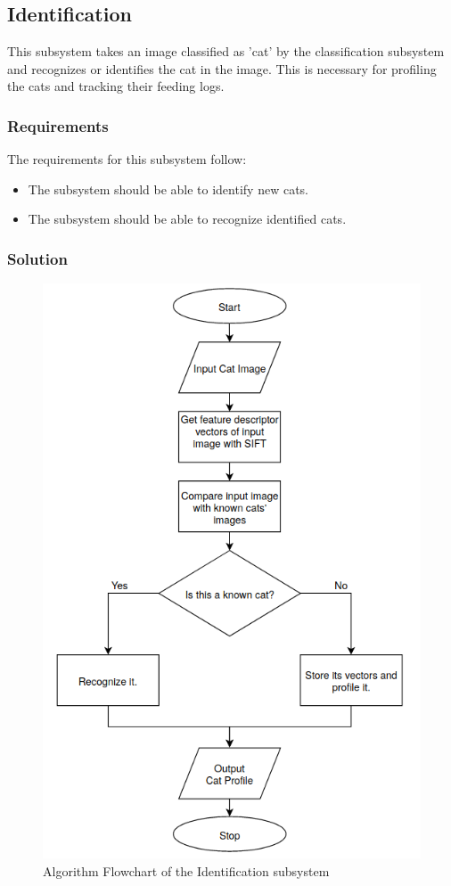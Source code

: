 \subsection{Identification} \label{subsec:identification}

This subsystem takes an image classified as 'cat' by the classification subsystem and recognizes or identifies the cat in the image. This is necessary for profiling the cats and tracking their feeding logs.

\subsubsection{Requirements}

The requirements for this subsystem follow:

\begin{itemize}

\item The subsystem should be able to identify new cats.
\item The subsystem should be able to recognize identified cats.

\end{itemize}

\subsubsection{Solution}

\begin{figure}[h!]
    \centering
    \includegraphics[width=0.55\linewidth]{img/sift_algorithm_flowchart.png}
    \caption{Algorithm Flowchart of the Identification subsystem}
    \label{fig:sift_algorithm_flowchart}
\end{figure}


